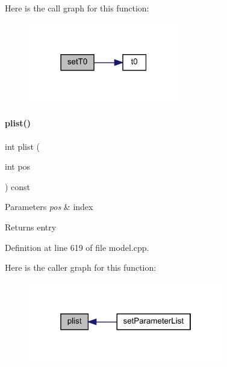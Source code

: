 Here is the call graph for this function\+:
\nopagebreak
\begin{figure}[H]
\begin{center}
\leavevmode
\includegraphics[width=186pt]{classamici_1_1_model_aaf5053fde7e205c89d89c000a7693987_cgraph}
\end{center}
\end{figure}
\mbox{\label{classamici_1_1_model_a6ac0de1b7dfddbb4a480657f62573563}} 
\paragraph{\texorpdfstring{plist()}{plist()}}
{\footnotesize\ttfamily int plist (\begin{DoxyParamCaption}\item[{int}]{pos }\end{DoxyParamCaption}) const}


\begin{DoxyParams}{Parameters}
{\em pos} & index \\
\hline
\end{DoxyParams}
\begin{DoxyReturn}{Returns}
entry 
\end{DoxyReturn}


Definition at line 619 of file model.\+cpp.

Here is the caller graph for this function\+:
\nopagebreak
\begin{figure}[H]
\begin{center}
\leavevmode
\includegraphics[width=241pt]{classamici_1_1_model_a6ac0de1b7dfddbb4a480657f62573563_icgraph}
\end{center}
\end{figure}
\mbox{\label{classamici_1_1_model_a7e63009c65fc1361cc5a6e1fc3d5ff1a}} 
